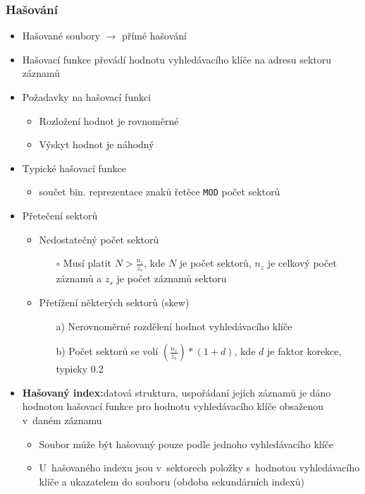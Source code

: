 \documentclass[a4paper,10pt]{article}
\newcommand{\pojem}[2]{\item \textbf{#1:}\quad #2}
\begin{document}
			\subsubsection{Hašování}
				\begin{itemize}
					\item Hašované soubory $\rightarrow$ přímé hašování
					\item Hašovací funkce převádí hodnotu vyhledávacího klíče na adresu sektoru záznamů

					\item Požadavky na hašovací funkci
					\begin{itemize}
						\item Rozložení hodnot je rovnoměrné
						\item Výskyt hodnot je náhodný
					\end{itemize}

					\item Typické hašovací funkce
					\begin{itemize}
						\item součet bin. reprezentace znaků řetěce \texttt{MOD} počet sektorů
					\end{itemize}

					\item Přetečení sektorů
					\begin{itemize}
						\item Nedostatečný počet sektorů
						\begin{itemize}
							\item[$\circ$] Musí platit $N > \frac{n_z}{z_s}$, kde $N$ je počet sektorů, $n_z$ je celkový počet záznamů a $z_s$ je počet záznamů sektoru
						\end{itemize}
						\item Přetížení některých sektorů (skew)
						\begin{itemize}
							\item[a)] Nerovnoměrné rozdělení hodnot vyhledávacího klíče
							\item[b)] Počet sektorů se volí $\left(\frac{n_z}{z_s}\right)*(1+d)$, kde $d$ je faktor korekce, typicky 0.2 
						\end{itemize}
					\end{itemize}

					\pojem{Hašovaný index}{datová struktura, uspořádaní jejích záznamů je dáno hodnotou hašovací funkce pro hodnotu vyhledávacího klíče obsaženou v~daném záznamu}
					\begin{itemize}
						\item Soubor může být hašovaný pouze podle jednoho vyhledávacího klíče
						\item U~hašovaného indexu jsou v~sektorech položky s~hodnotou vyhledávacího klíče a ukazatelem do souboru (obdoba sekundárních indexů)
					\end{itemize}


\end{itemize}
\end{document}
